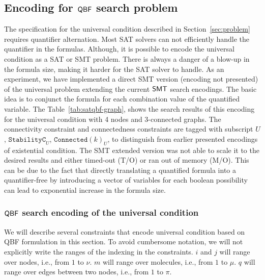 \subsection{Encoding for $\mathsf{QBF}$ search problem}\label{enc:univ-cond}
%

\noindent The specification for the universal condition described in Section~\ref{sec:problem} requires quantifier alternation. 
%
Most SAT solvers can not efficiently handle the quantifier in the formulas. 
% 
Although, it is possible to encode the universal condition as a SAT or SMT problem.
%
There is always a danger of a blow-up in the formula size, making it harder for the SAT solver to handle. 
% 
As an experiment, we have implemented a direct SMT version (encoding not presented) of the universal problem extending the current $\mathsf{SMT}$ search encodings.
%
The basic idea is to conjunct the formula for each combination value of the quantified variable. 
%
The Table~\ref{tab:satqbf-graph}, shows the search results of this encoding for the universal condition with 4 nodes and 3-connected graphs. 
%
The connectivity constraint and connectedness constraints are tagged with subscript $U$, $\texttt{StabilityC}_{U}$, $\texttt{Connected}(k)_{U}$,  to distinguish from earlier presented encodings of existential condition.
%
The SMT extended version was not able to scale it to the desired results and either timed-out (T/O) or ran out of memory (M/O).
%
This can be due to the fact that directly translating a quantified formula into a quantifier-free by introducing a vector of variables for each boolean possibility can lead to exponential increase in the formula size.
%
%
\subsubsection{$\mathsf{QBF}$ search encoding of the universal condition}
We will describe several constraints that encode universal condition based on QBF formulation in this section.
%
To avoid cumbersome notation, we will not explicitly write the ranges
of the indexing in the constraints.
%
$i$ and $j$ will range over nodes, i.e., from $1$ to $\nu$.
%
$m$ will range over molecules, i.e., from $1$ to $\mu$.
%
$q$ will range over edges between two nodes, i.e., from $1$ to $\pi$.
%

